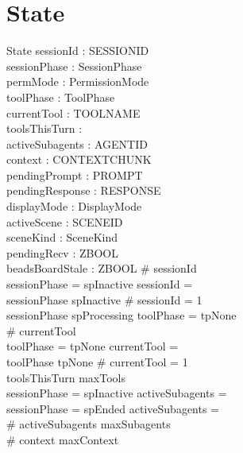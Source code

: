 \documentclass[a4paper,10pt,fleqn]{article}
\begin{document}
\section{State}

\begin{schema}{State}
  sessionId : \finset SESSIONID \\
  sessionPhase : SessionPhase \\
  permMode : PermissionMode \\
  toolPhase : ToolPhase \\
  currentTool : \finset TOOLNAME \\
  toolsThisTurn : \nat \\
  activeSubagents : \finset AGENTID \\
  context : \seq CONTEXTCHUNK \\
  pendingPrompt : \finset PROMPT \\
  pendingResponse : \finset RESPONSE \\
  displayMode : DisplayMode \\
  activeScene : \finset SCENEID \\
  sceneKind : \finset SceneKind \\
  pendingRecv : ZBOOL \\
  beadsBoardStale : ZBOOL
  \where
  \# sessionId  \\
  sessionPhase = spInactive \implies sessionId = \emptyset \\
  sessionPhase \neq spInactive \implies \# sessionId = 1 \\
  sessionPhase \neq spProcessing \implies toolPhase = tpNone \\
  \# currentTool  \\
  toolPhase = tpNone \implies currentTool = \emptyset \\
  toolPhase \neq tpNone \implies \# currentTool = 1 \\
  toolsThisTurn \leq maxTools \\
  sessionPhase = spInactive \implies activeSubagents = \emptyset \\
  sessionPhase = spEnded \implies activeSubagents = \emptyset \\
  \# activeSubagents \leq maxSubagents \\
  \# context \leq maxContext \\

\end{schema}
\end{document}
